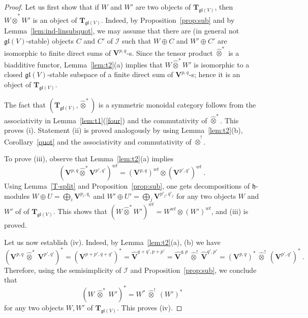 \documentclass[12pt,reqno]{amsart}
\theoremstyle{definition}
\theoremstyle{remark}
\begin{document}
	\begin{proof}
	Let us first show that if $W$ and $W'$ are two objects of $\mathbf{T}_{\mathfrak{gl}(V)}$, then $W\widehat{\otimes}^\ast W'$ is an object of $\mathbf{T}_{\mathfrak{gl}(V)}$. Indeed, by Proposition~\ref{prop:sub} and by Lemma~\ref{lem:ind-linsubquot}, we may assume that there are  (in general not $\mathfrak{gl}(V)$-stable) objects $C$ and $C'$ of $\mathcal{I}$ such that $W\oplus C$ and $W' \oplus C'$ are isomorphic to finite direct sums of $\mathbf{V}^{p,q}$-s. Since the tensor product $\widehat{\otimes}^\ast$ is a biadditive functor, Lemma~\ref{lem:t2}(a) implies that $W\widehat{\otimes}^\ast W'$ is isomorphic to a closed $\mathfrak{gl}(V)$-stable subspace of a finite direct sum of $\mathbf{V}^{p,q}$-s; hence it is an object of $\mathbf{T}_{\mathfrak{gl}(V)}$. 
	
	The fact that $(\mathbf{T}_{\mathfrak{gl}(V)}, \widehat{\otimes}^\ast)$ is a symmetric monoidal category
	follows from the associativity in Lemma~\ref{lem:t1}(\ref{four}) and the commutativity of $\widehat{\otimes}^\ast$. This proves (i).
	Statement (ii) is proved analogously by using Lemma~\ref{lem:t2}(b), Corollary~\ref{quot} and the associativity and commutativity of $\widehat{\otimes}^!$.
	
	To prove (iii), observe that Lemma~\ref{lem:t2}(a) implies
	$$(\mathbf{V}^{p,q} \widehat{\otimes}^\ast \mathbf{V}^{p',q'})^{wt} = (\mathbf{V}^{p,q})^{wt }\otimes (\mathbf{V}^{p',q'})^{wt} \ . $$
	Using Lemma~\ref{T-split} and Proposition~\ref{prop:sub}, one gets  decompositions of $\mathfrak{h}$-modules $W\oplus U = \bigoplus_i \mathbf{V}^{p_i,q_i}$ and $W'\oplus U' = \bigoplus_j \mathbf{V}^{p'_j,q'_j}$ for any two objects $W$ and $W'$  of of $\mathbf{T}_{\mathfrak{gl}(V)}$. 
	This shows that $(W\widehat{\otimes}^\ast W')^{wt} = W^{wt}\otimes (W')^{wt}$, and (iii) is proved.
	
	Let us now establish (iv). Indeed, by Lemma~\ref{lem:t2}(a), (b) we have
	$$(\mathbf{V}^{p,q} \ \widehat{\otimes}^\ast \ \mathbf{V}^{p',q'})^\ast = (\mathbf{V}^{p+p',q+q'})^\ast
	= \widehat{\mathbf{V}}^{q+q', p+p'} = \widehat{\mathbf{V}}^{q, p} \ \widehat{\otimes}^! \  \widehat{\mathbf{V}}^{q', p'}
	= (\mathbf{V}^{p,q})^\ast \ \widehat{\otimes}^! \ (\mathbf{V}^{p',q'})^\ast \ . $$
	Therefore, using the semisimplicity of $\mathcal{I}$ and Proposition~\ref{prop:sub}, we conclude that 
	$$(W\ \widehat{\otimes}^\ast \ W')^\ast = W^\ast \ \widehat{\otimes}^! \  (W')^\ast$$ 
	for any two objects $W, W'$ of $\mathbf{T}_{\mathfrak{gl}(V)}$. This proves (iv).
	\end{proof}
	
\end{document}
